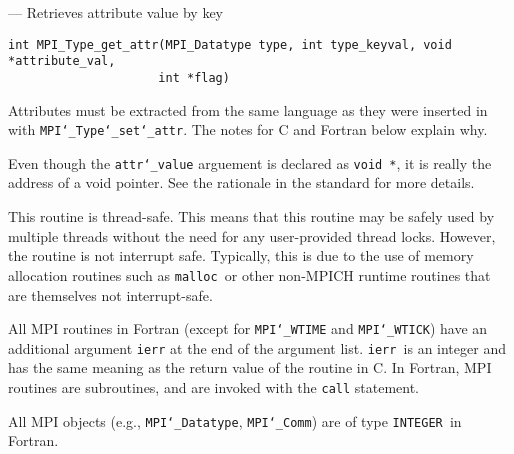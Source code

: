 \startmanpage
{}
--- Retrieves attribute value by key 
\startvb\begin{verbatim}
int MPI_Type_get_attr(MPI_Datatype type, int type_keyval, void *attribute_val, 
                     int *flag)

\end{verbatim}
\endvb

\par
{}
\par
{}
Attributes must be extracted from the same language as they were inserted
in with {\tt MPI{\tt \char`\_}Type{\tt \char`\_}set{\tt \char`\_}attr}.  The notes for C and Fortran below explain
why.
\par
{}
Even though the {\tt attr{\tt \char`\_}value} arguement is declared as {\tt void *}, it is
really the address of a void pointer.  See the rationale in the
standard for more details.
\par
{}
\par
This routine is thread-safe.  This means that this routine may be
safely used by multiple threads without the need for any user-provided
thread locks.  However, the routine is not interrupt safe.  Typically,
this is due to the use of memory allocation routines such as {\tt malloc
}or other non-MPICH runtime routines that are themselves not interrupt-safe.
\par
{}
All MPI routines in Fortran (except for {\tt MPI{\tt \char`\_}WTIME} and {\tt MPI{\tt \char`\_}WTICK}) have
an additional argument {\tt ierr} at the end of the argument list.  {\tt ierr
}is an integer and has the same meaning as the return value of the routine
in C.  In Fortran, MPI routines are subroutines, and are invoked with the
{\tt call} statement.
\par
All MPI objects (e.g., {\tt MPI{\tt \char`\_}Datatype}, {\tt MPI{\tt \char`\_}Comm}) are of type {\tt INTEGER
}in Fortran.
\par
{}
\par
